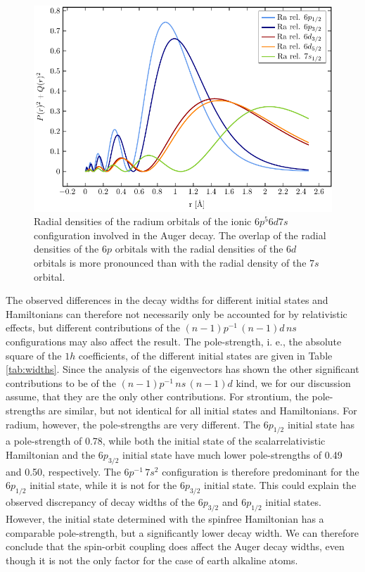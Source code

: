 \begin{figure}[h]
 \centering
 \includegraphics[width=\columnwidth]{pics/ra_6d_R.pdf}
 \caption{Radial densities of the radium orbitals of the ionic $6p^5 6d 7s$
          configuration involved in the Auger decay. The overlap of the radial
          densities of the $6p$ orbitals with the radial densities of the $6d$ orbitals
          is more pronounced than with the radial density of the $7s$ orbital.}
 \label{fig:radial_ra}
\end{figure}

The observed differences in the decay widths for different initial states and
Hamiltonians can therefore not necessarily only be accounted for by relativistic
effects, but different contributions of the $(n-1)p^{-1} \,(n-1)d \, ns$
configurations may also affect the result.
The pole-strength, i. e., the absolute square of the $1h$ coefficients,
of the different initial states are
given in Table \ref{tab:widths}.
Since the analysis of the eigenvectors has shown the other significant contributions
to be of the $(n-1)p^{-1} \,ns \, (n-1)d$ kind, we for our discussion assume, that
they are the only other contributions.
For strontium, the pole-strengths are similar, but not identical for all initial
states and Hamiltonians. For radium, however, the pole-strengths are very different.
The $6p_{1/2}$ initial state has a pole-strength of 0.78, while both the
initial state of the scalarrelativistic Hamiltonian and the $6p_{3/2}$ initial
state have much lower pole-strengths of 0.49 and 0.50, respectively.
The $6p^{-1} \,7s^2$ configuration is therefore predominant for the $6p_{1/2}$
initial state, while it is not for the $6p_{3/2}$ initial state. This could
explain the observed discrepancy of decay widths of the $6p_{3/2}$ and
$6p_{1/2}$ initial states. However, the initial state determined with the spinfree
Hamiltonian has a comparable pole-strength, but a significantly lower decay
width. We can therefore conclude that the spin-orbit coupling does affect
the Auger decay widths, even though it is not the only factor for the case of
earth alkaline atoms.


